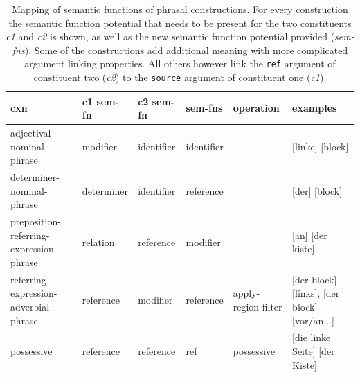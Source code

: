 \begin{table}
\begin{footnotesize}
\begin{tabularx}{\textwidth}{YYYYYY}
\lsptoprule
cxn &  c1 sem-fn & c2 sem-fn & sem-fns & operation  & examples\\
\midrule
adjectival-nominal-phrase  & modifier &identifier &identifier & &[linke] [block] 
\\ \midrule
determiner-nominal-phrase  & determiner & identifier & reference & & [der] [block] 
\\ \midrule
preposition-referring-expression-phrase & relation &reference & modifier &  & [an] [der kiste] 
\\ \midrule 
referring-expression-adverbial-phrase  & reference & modifier & reference & 
apply-region-filter & [der block] [links], [der block] [vor/an...] 
\\ \midrule 
possessive  & reference & reference & ref & possessive
& [die linke Seite] [der Kiste] 
\\\lspbottomrule
\end{tabularx}
\end{footnotesize}
\caption[Mapping of semantic functions]{Mapping of semantic functions of phrasal constructions. For every construction the semantic function 
potential that needs to be present for the two constituents \emph{c1} and \emph{c2} is shown, as well as the 
new semantic function potential provided (\emph{sem-fns}). Some of the constructions add additional meaning
with more complicated argument linking properties. All others however link the {\footnotesize\tt ref} argument of constituent two (\emph{c2}) to the {\footnotesize\tt source} argument of constituent one (\emph{c1}).}
\label{t:phrasal-sem}
\end{table}

